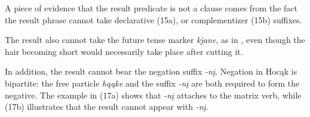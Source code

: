 \documentclass[output=paper]{LSP/langsci}
\begin{document}
A piece of evidence that the result predicate is not a clause comes from the fact the result phrase cannot take declarative (15a), or complementizer (15b) suffixes.

\begin{exe}
\ex
\begin{xlist}



\end{xlist}
\end{exe}

The result also cannot take the future tense marker \textit{kjane}, as in , even though the hair becoming short would necessarily take place after cutting it.

\begin{exe}


\end{exe}

In addition, the result cannot bear the negation suffix \textit{-nį}. Negation in Hocąk is bipartite: the free particle \textit{hąąke} and the suffix \textit{-nį} are both required to form the negative. The example in (17a) shows that \textit{-nį} attaches to the matrix verb, while (17b) illustrates that the result cannot appear with \textit{-nį}.
\end{document}
